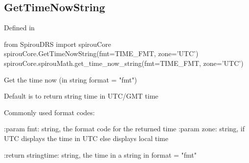 \noindent\begin{minipage}{\textwidth}
\subsection{GetTimeNowString}

Defined in \spirouCore{}

\begin{pythonbox}
from SpirouDRS import spirouCore
spirouCore.GetTimeNowString(fmt=TIME_FMT, zone='UTC')
spirouCore.spirouMath.get_time_now_string(fmt=TIME_FMT, zone='UTC')
\end{pythonbox}

\begin{pythondocstring}
Get the time now (in string format = "fmt")

Default is to return string time in UTC/GMT time

    Commonly used format codes:



:param fmt: string, the format code for the returned time
:param zone: string, if UTC displays the time in UTC else displays local
             time

:return stringtime: string, the time in a string in format = "fmt"
\end{pythondocstring}
\end{minipage}


